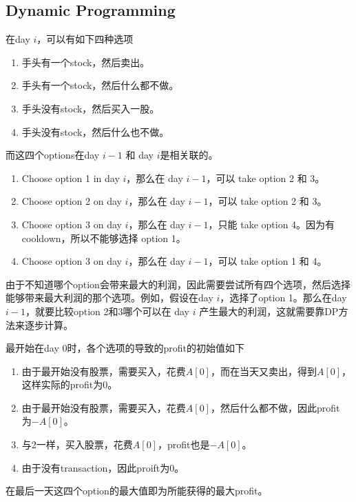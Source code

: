 \subsection{Dynamic Programming}
在day $ i $，可以有如下四种选项
\begin{enumerate}
\item 手头有一个stock，然后卖出。
\item 手头有一个stock，然后什么都不做。
\item 手头没有stock，然后买入一股。
\item 手头没有stock，然后什么也不做。
\end{enumerate}
而这四个options在day $ i-1 $ 和 day $ i $是相关联的。
\begin{enumerate}
\item Choose option 1 in day $ i $，那么在 day $ i-1 $，可以 take option 2 和 3。
\item Choose option 2 on day $ i $，那么在 day $ i-1 $，可以 take option 2 和 3。
\item Choose option 3 on day $ i $，那么在 day $ i-1 $，只能 take option 4。因为有cooldown，所以不能够选择 option 1。
\item Choose option 3 on day $ i $，那么在 day $ i-1 $，可以 take option 1 和 4。
\end{enumerate}
由于不知道哪个option会带来最大的利润，因此需要尝试所有四个选项，然后选择能够带来最大利润的那个选项。例如，假设在day $ i $，选择了option 1。那么在day $ i-1 $，就要比较option 2和3哪个可以在 day $ i $ 产生最大的利润，这就需要靠DP方法来逐步计算。
\par
最开始在day 0时，各个选项的导致的profit的初始值如下
\begin{enumerate}
\item 由于最开始没有股票，需要买入，花费$A[0]$，而在当天又卖出，得到$A[0]$，这样实际的profit为0。
\item 由于最开始没有股票，需要买入，花费$A[0]$，然后什么都不做，因此profit 为$-A[0]$。
\item 与2一样，买入股票，花费$A[0]$，profit也是$-A[0]$。
\item 由于没有transaction，因此proift为0。
\end{enumerate}
在最后一天这四个option的最大值即为所能获得的最大profit。
\setcounter{lstlisting}{0}
